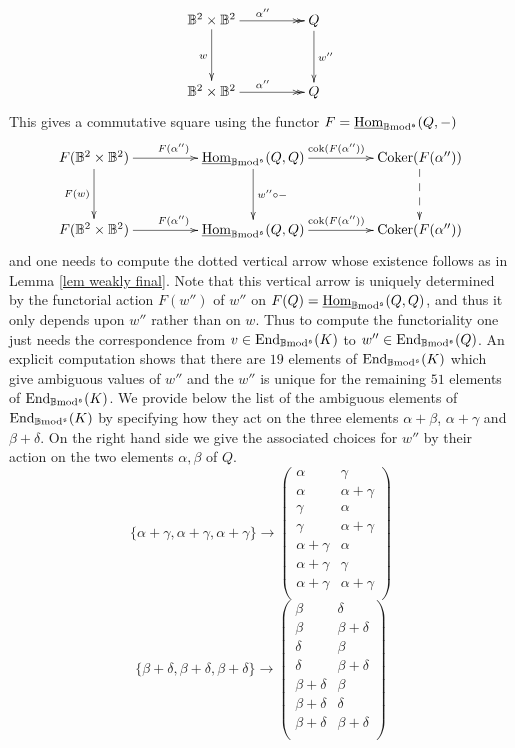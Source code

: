 \documentclass[12pt]{article}
\def\End{{\rm End}}
\def\Homi{{\underline{\rm Hom}}}
\def\coker{{\rm Coker}}
\def\scoker{{\rm cok}}
\def\B{{\mathbb B}}
\def\End{{\mbox{End}}}
\def\b2{{\rm \B mod^{\mathfrak s}}}
\begin{document}
\begin{equation}\label{w double prime}
\xymatrix@C=20pt@R=35pt{
 \B^2\times \B^2\ar[d]_{w} \ar@{->>}[rr]^{\alpha''}&& Q\ar[d]^{w''}
\\
 \B^2\times \B^2 \ar@{->>}[rr]^{\alpha''}&& Q }
\end{equation} 
This gives a commutative square using the functor $F=\Homi_\b2(Q,-)$
\begin{equation}\label{applying F}
\xymatrix@C=20pt@R=35pt{
 F(\B^2\times \B^2)\ar[d]_{F(w)} \ar[rr]^{F(\alpha'')}&& \Homi_\b2(Q,Q)\ar[d]^{w''\circ - }\ar[rr]^{\scoker(F(\alpha''))}&& \coker(F(\alpha''))\ar@{-->}[d]
\\
 F(\B^2\times \B^2) \ar[rr]^{F(\alpha'')}&& \Homi_\b2(Q,Q) \ar[rr]^{\scoker(F(\alpha''))}&& \coker(F(\alpha''))}\end{equation} 
 and one needs to compute the dotted vertical arrow whose existence follows as in Lemma \ref{lem weakly final}. Note that this vertical arrow is uniquely determined by the functorial action $F(w'')$ of $w''$ on $F(Q)=\Homi_\b2(Q,Q)$, and thus it only depends upon $w''$ rather than on $w$. Thus to compute the functoriality one just needs the correspondence from $v\in \End_\b2(K)$ to $w''\in \End_\b2(Q)$. An explicit computation shows that there are $19$ elements of $\End_\b2(K)$ which give ambiguous values of $w''$ and the $w''$ is unique for the remaining $51$ elements of $\End_\b2(K)$. We provide below the list of the ambiguous elements of $\End_\b2(K)$ by specifying how they act on the three elements $\alpha+\beta$, $\alpha+\gamma$ and $\beta+\delta$. On the right hand side we give the associated choices for $w''$ by their action on the two elements $\alpha,\beta$ of $Q$. 
 $$
 \{\alpha +\gamma ,\alpha +\gamma ,\alpha +\gamma \}\to \left(
\begin{array}{cc}
 \alpha  & \gamma  \\
 \alpha  & \alpha +\gamma  \\
 \gamma  & \alpha  \\
 \gamma  & \alpha +\gamma  \\
 \alpha +\gamma  & \alpha  \\
 \alpha +\gamma  & \gamma  \\
 \alpha +\gamma  & \alpha +\gamma  \\
\end{array}
\right)
$$
$$
\{\beta +\delta ,\beta +\delta ,\beta +\delta \}\to \left(
\begin{array}{cc}
 \beta  & \delta  \\
 \beta  & \beta +\delta  \\
 \delta  & \beta  \\
 \delta  & \beta +\delta  \\
 \beta +\delta  & \beta  \\
 \beta +\delta  & \delta  \\
 \beta +\delta  & \beta +\delta  \\
\end{array}
\right)
$$
\end{document}
